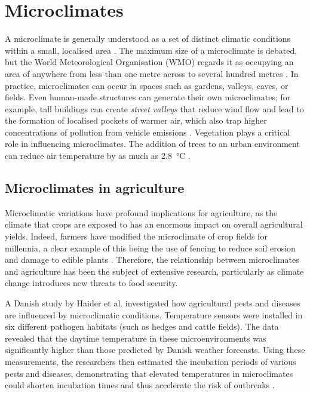 \section{Microclimates}

A microclimate is generally understood as a set of distinct climatic conditions
within a small, localised area \cite{MetOffice2023}. The maximum size of a
microclimate is debated, but the World Meteorological Organisation (WMO) regards
it as occupying an area of anywhere from less than one metre across to several
hundred metres \cite{wmo2024}.  In practice, microclimates can occur in spaces
such as gardens, valleys, caves, or fields. Even human-made structures can
generate their own microclimates; for example, tall buildings can create
\emph{street valleys} that reduce wind flow and lead to the formation of
localised pockets of warmer air, which also trap higher concentrations of
pollution from vehicle emissions \cite{yang2023}. Vegetation plays a critical
role in influencing microclimates. The addition of trees to an urban environment
can reduce air temperature by as much as \SI{2.8}{\degreeCelsius}
\cite{lai2019}.

\subsection{Microclimates in agriculture}

Microclimatic variations have profound implications for agriculture, as the
climate that crops are exposed to has an enormous impact on overall agricultural
yields. Indeed, farmers have modified the microclimate of crop fields for
millennia, a clear example of this being the use of fencing to reduce soil
erosion and damage to edible plants \cite{cleugh1998}. Therefore, the
relationship between microclimates and agriculture has been the subject of
extensive research, particularly as climate change introduces new threats to
food security.

A Danish study by Haider et al. investigated how agricultural pests and diseases
are influenced by microclimatic conditions. Temperature sensors were installed
in six different pathogen habitats (such as hedges and cattle fields). The data
revealed that the daytime temperature in these microenvironments was
significantly higher than those predicted by Danish weather forecasts. Using
these measurements, the researchers then estimated the incubation periods of
various pests and diseases, demonstrating that elevated temperatures in
microclimates could shorten incubation times and thus accelerate the risk of
outbreaks \cite{haider2017}.

